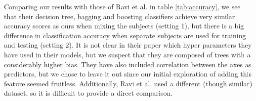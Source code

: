Comparing our results with those of Ravi et al.\cite{ravi} in table \ref{tab:accuracy}, we see that their decision tree, bagging and boosting classifiers achieve very similar accuracy scores as ours when mixing the subjects (setting 1), but there is a big difference in classification accuracy when separate subjects are used for training and testing (setting 2). It is not clear in their paper which hyper parameters they have used in their models, but we suspect that they are composed of trees with a considerably higher bias. They have also included correlation between the axes as predictors, but we chose to leave it out since our initial exploration of adding this feature seemed fruitless. Additionally, Ravi et al. used a different (though similar) dataset, so it is difficult to provide a direct comparison.